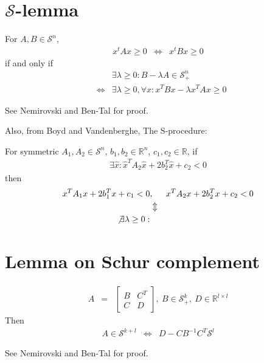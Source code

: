 \documentclass{article}
\begin{document}
\section{$\mathcal{S}$-lemma}

For $A,B\in\mathcal{S}^n$, 
\begin{eqnarray}
    x^tAx\geq 0 & \Leftrightarrow & x^tBx\geq 0
\end{eqnarray}
if and only if
\begin{eqnarray}
    &&\exists \lambda\geq 0: B-\lambda A \in \mathcal{S}^n_+ \\
    &\Leftrightarrow & \exists \lambda\geq 0, \forall x : x^T Bx-\lambda x^TAx \geq 0
\end{eqnarray}

See Nemirovski and Ben-Tal for proof.

Also, from Boyd and Vandenberghe, The S-procedure:

For symmetric $A_1,A_2\in\mathcal{S}^n$, $b_1,b_2\in\mathbb{R}^n$, $c_1,c_2\in\mathbb{R}$, if
\begin{eqnarray}
    \exists \hat{x}: \hat{x}^TA_2\hat{x} + 2b_2^T\hat{x} + c_2 < 0
\end{eqnarray}
then 
\begin{eqnarray}
    x^T A_1x + 2b_1^Tx + c_1 < 0 &,&  x^T A_2x + 2b_2^Tx + c_2 < 0 \\
    &\Updownarrow& \\
    \not\exists \lambda\geq 0:
\end{eqnarray}




\section{Lemma on Schur complement}
\begin{eqnarray}
    A & = & \left[\begin{array}{cc} B & C^T \\ C & D\end{array}\right],\ B\in\mathcal{S}^k_+,\ D\in\mathbb{R}^{l\times l}
\end{eqnarray}
Then 
\begin{eqnarray}
    A\in\mathcal{S}^{k+l} & \Leftrightarrow & D-CB^{-1}C^T \mathcal{S}^{l}
\end{eqnarray}

See Nemirovski and Ben-Tal for proof.
\end{document}

